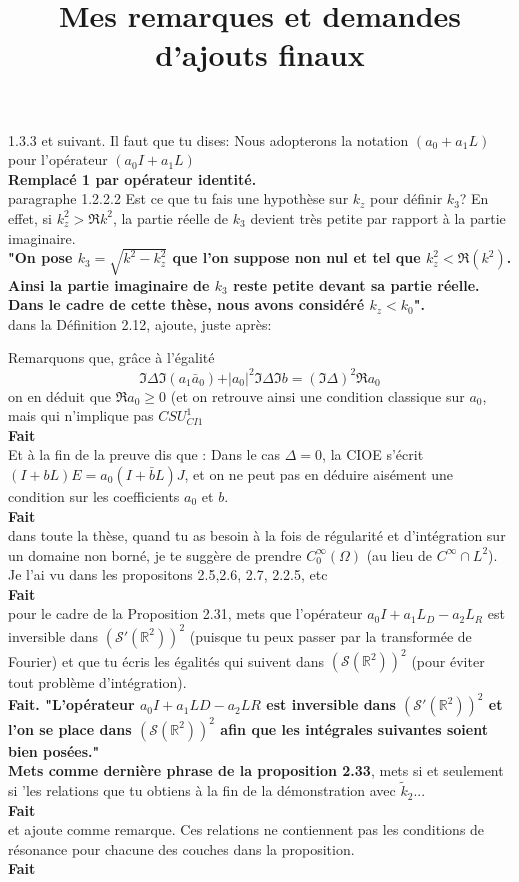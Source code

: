 \documentclass{article}
\title{Mes remarques et demandes d'ajouts finaux}
\date{}
\newcommand{\R}{\mathbb{R}}
\newcommand{\rep}[1]{\\\textbf{#1}\\}
\begin{document}
\maketitle

1.3.3 et suivant. Il faut que tu dises: Nous adopterons la notation $(a_0+a_1L)$ pour l'opérateur $(a_0I+a_1L)$
\rep{
	Remplacé 1 par opérateur identité.
}

paragraphe 1.2.2.2 Est ce que tu fais une hypothèse sur $k_z$ pour définir $k_3$? En effet, si $k_z^2>\Re k^2$, la partie réelle de $k_3$ devient très petite par rapport à la partie imaginaire.
\rep{
	"On pose \(k_3 = \sqrt{k^2 - k_z^2}\) que l'on suppose non nul et tel que \(k_z^2 < \Re(k^2)\).
	Ainsi la partie imaginaire de \(k_3\) reste petite devant sa partie réelle.
	Dans le cadre de cette thèse, nous avons considéré \(k_z < k_0\)".
}


dans la Définition 2.12, ajoute, juste après:

Remarquons que, grâce à l'égalité
$$\Im \Delta \Im (a_1{\bar a}_0)+\vert a_0\vert^2\Im \Delta\Im b= (\Im \Delta)^2\Re a_0$$
on en déduit que $\Re a_0\geq 0$ (et on retrouve ainsi une condition classique sur $a_0$, mais qui n'implique pas $CSU^1_{CI1}$
\rep{Fait}

Et à la fin de la preuve dis que : Dans le cas $\Delta=0$, la CIOE s'écrit $(I+bL)E=a_0(I+{\bar b}L)J$, et on ne peut pas en déduire aisément une condition sur les coefficients $a_0$ et $b$.
\rep{Fait}

dans toute la thèse, quand tu as besoin à la fois de régularité et d'intégration sur un domaine non borné, je te suggère de prendre $C^{\infty}_0(\Omega)$ (au lieu de $C^{\infty}\cap L^2$). Je l'ai vu dans les propositons 2.5,2.6, 2.7, 2.2.5, etc
\rep{Fait}

pour le cadre de la Proposition 2.31, mets que l'opérateur $a_0I+a_1L_D-a_2L_R$ est inversible dans $(\mathcal{S}'(\R^2))^2$ (puisque tu peux passer par la transformée de Fourier) et que tu écris les égalités qui suivent dans $(\mathcal{S}(\R^2))^2$ (pour éviter tout problème d'intégration).
\rep{Fait. "L'opérateur \(a_0I + a_1 LD - a_2 LR\) est  inversible dans \((\mathcal{S}'(\R^2))^2\) et l'on se place dans \((\mathcal{S}(\R^2))^2\) afin que les intégrales suivantes soient bien posées."}

{\bf Mets comme dernière phrase de la proposition 2.33}, mets
si et seulement si  'les relations que tu obtiens à la fin de la démonstration avec ${\tilde k_2}...$
\rep{Fait}

et ajoute comme remarque. Ces relations ne contiennent pas les conditions de résonance pour chacune des couches dans la proposition.
\rep{Fait}
\end{document}
